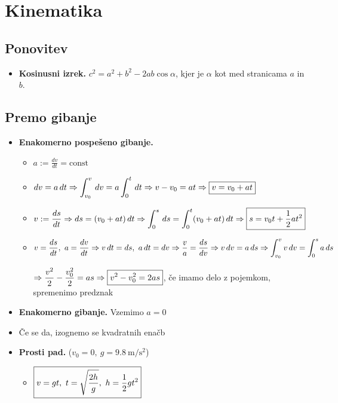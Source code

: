 \section{Kinematika}
\subsection*{Ponovitev}
\begin{itemize}
    \item \textbf{Kosinusni izrek.} \(c^2 = a^2 + b^2 - 2ab \cos \alpha\), kjer je \(\alpha\) kot med stranicama \(a\) in \(b\).
\end{itemize}

\subsection{Premo gibanje}
\begin{itemize}
    \item \textbf{Enakomerno pospešeno gibanje.} 
    \begin{itemize}
        \item \(a := \frac{dv}{dt} = \text{const}\)
        \item \(\displaystyle dv = a \, dt \Rightarrow \int_{v_0}^{v} \, dv = a \int_{0}^{t} \, dt \Rightarrow v - v_0 = at \Rightarrow  \boxed{v = v_0 + at}\)
        \item \(\displaystyle v := \frac{ds}{dt} \Rightarrow ds = (v_0 + at) \, dt \Rightarrow \int_{0}^{s} \, ds = \int_{0}^{t} (v_0 + at) \, dt \Rightarrow \boxed{s = v_0t + \frac{1}{2}at^2}\)
        \item \(\displaystyle v = \frac{ds}{dt}, \ a = \frac{dv}{dt} \Rightarrow v \, dt = ds, \ a \, dt = dv \Rightarrow \frac{v}{a} = \frac{ds}{dv} \Rightarrow v \, dv = a \, ds \Rightarrow \int_{v_0}^{v} v \, dv = \int_{0}^{s} a \, ds\)
        
        \(\displaystyle \Rightarrow \frac{v^2}{2} - \frac{v_0^2}{2} = as \Rightarrow \boxed{v^2 - v_0^2 = 2as}\), če imamo delo z pojemkom, spremenimo predznak
    \end{itemize}
    \item \textbf{Enakomerno gibanje.} Vzemimo \(a = 0\)
    \item Če se da, izognemo se kvadratnih enačb
    \item \textbf{Prosti pad.} (\(v_0 = 0, \  g = 9.8 \  \text{m} / \text{s}^2\))
    \begin{itemize}
        \item \(\displaystyle \boxed{v = gt, \ t = \sqrt{\frac{2h}{g}}, \ h = \frac{1}{2} g t^2}\)
    \end{itemize}
\end{itemize}

